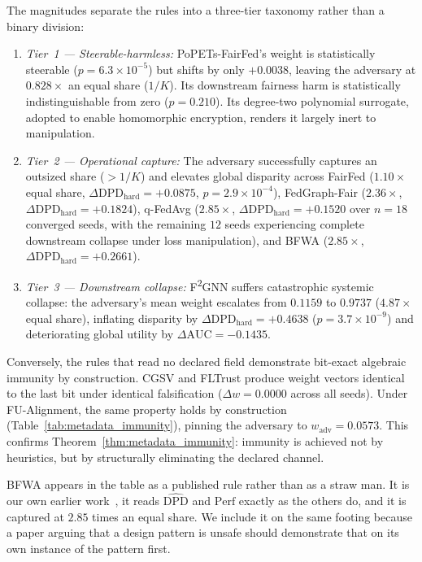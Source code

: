 \documentclass[preprint,12pt]{elsarticle}
\theoremstyle{plain}
\theoremstyle{definition}
\theoremstyle{remark}
\newcommand{\dpd}{\mathrm{DPD}}
\begin{document}
The magnitudes separate the rules into a three-tier taxonomy rather than a binary division:
\begin{enumerate}
\item \emph{Tier~1 --- Steerable-harmless:} PoPETs-FairFed's weight is statistically steerable ($p = 6.3 \times 10^{-5}$) but shifts by only $+0.0038$, leaving the adversary at $0.828\times$ an equal share ($1/K$). Its downstream fairness harm is statistically indistinguishable from zero ($p = 0.210$). Its degree-two polynomial surrogate, adopted to enable homomorphic encryption, renders it largely inert to manipulation.
\item \emph{Tier~2 --- Operational capture:} The adversary successfully captures an outsized share ($>1/K$) and elevates global disparity across FairFed ($1.10\times$ equal share, $\Delta\mathrm{DPD}_{\mathrm{hard}} = +0.0875$, $p = 2.9 \times 10^{-4}$), FedGraph-Fair ($2.36\times$, $\Delta\mathrm{DPD}_{\mathrm{hard}} = +0.1824$), q-FedAvg ($2.85\times$, $\Delta\mathrm{DPD}_{\mathrm{hard}} = +0.1520$ over $n=18$ converged seeds, with the remaining $12$ seeds experiencing complete downstream collapse under loss manipulation), and BFWA ($2.85\times$, $\Delta\mathrm{DPD}_{\mathrm{hard}} = +0.2661$).
\item \emph{Tier~3 --- Downstream collapse:} F\textsuperscript{2}GNN suffers catastrophic systemic collapse: the adversary's mean weight escalates from $0.1159$ to $0.9737$ ($4.87\times$ equal share), inflating disparity by $\Delta\mathrm{DPD}_{\mathrm{hard}} = +0.4638$ ($p = 3.7 \times 10^{-9}$) and deteriorating global utility by $\Delta\mathrm{AUC} = -0.1435$.
\end{enumerate}

Conversely, the rules that read no declared field demonstrate bit-exact algebraic immunity by construction. CGSV and FLTrust produce weight vectors identical to the last bit under identical falsification ($\Delta w = 0.0000$ across all seeds). Under FU-Alignment, the same property holds by construction (Table~\ref{tab:metadata_immunity}), pinning the adversary to $w_{\mathrm{adv}} = 0.0573$. This confirms Theorem~\ref{thm:metadata_immunity}: immunity is achieved not by heuristics, but by structurally eliminating the declared channel.

BFWA appears in the table as a published rule rather than as a straw man. It is our own earlier work~\cite{dang2026fedfairgnn}, it reads $\widehat{\dpd}$ and $\mathrm{Perf}$ exactly as the others do, and it is captured at $2.85$ times an equal share. We include it on the same footing because a paper arguing that a design pattern is unsafe should demonstrate that on its own instance of the pattern first.
\end{document}
